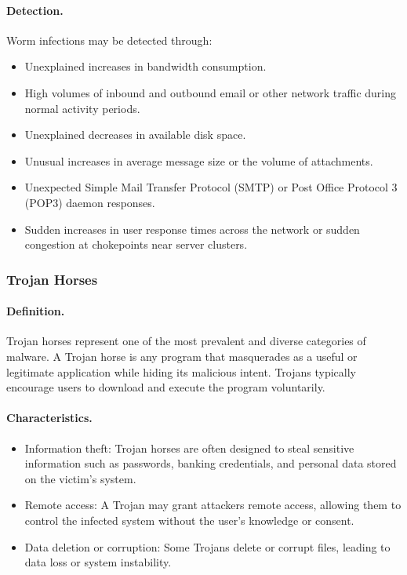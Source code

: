 \paragraph{Detection.}
Worm infections may be detected through:

\begin{itemize}
  \item Unexplained increases in bandwidth consumption.
  \item High volumes of inbound and outbound email or other network traffic during normal activity periods.
  \item Unexplained decreases in available disk space.
  \item Unusual increases in average message size or the volume of attachments.
  \item Unexpected Simple Mail Transfer Protocol (SMTP) or Post Office Protocol 3 (POP3) daemon responses.
  \item Sudden increases in user response times across the network or sudden congestion at chokepoints near server clusters.
\end{itemize}

\subsubsection{Trojan Horses}

\paragraph{Definition.}
Trojan horses represent one of the most prevalent and diverse categories of malware. A Trojan horse is any program that masquerades as a useful or legitimate application while hiding its malicious intent. Trojans typically encourage users to download and execute the program voluntarily.

\paragraph{Characteristics.}
\begin{itemize}
  \item Information theft: Trojan horses are often designed to steal sensitive information such as passwords, banking credentials, and personal data stored on the victim's system.
  \item Remote access: A Trojan may grant attackers remote access, allowing them to control the infected system without the user's knowledge or consent.
  \item Data deletion or corruption: Some Trojans delete or corrupt files, leading to data loss or system instability.
\end{itemize}

